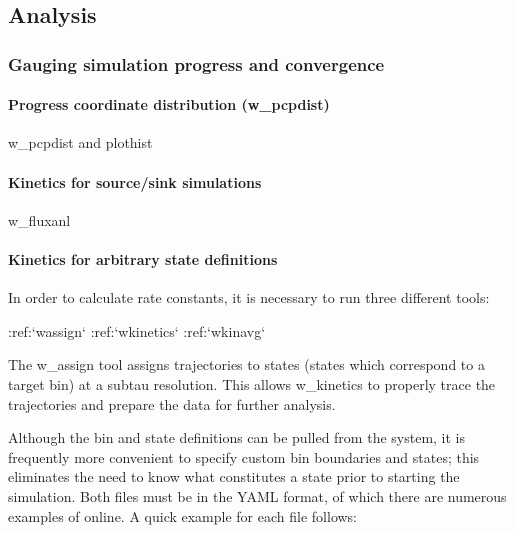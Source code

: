 \documentclass[letterpaper,10pt,english]{sphinxmanual}
\begin{document}
\subsection{Analysis}
\label{\detokenize{users_guide/west/analysis:analysis}}\label{\detokenize{users_guide/west/analysis::doc}}

\subsubsection{Gauging simulation progress and convergence}
\label{\detokenize{users_guide/west/analysis:gauging-simulation-progress-and-convergence}}

\paragraph{Progress coordinate distribution (w\_pcpdist)}
\label{\detokenize{users_guide/west/analysis:progress-coordinate-distribution-w-pcpdist}}
w\_pcpdist and plothist


\paragraph{Kinetics for source/sink simulations}
\label{\detokenize{users_guide/west/analysis:kinetics-for-source-sink-simulations}}
w\_fluxanl


\paragraph{Kinetics for arbitrary state definitions}
\label{\detokenize{users_guide/west/analysis:kinetics-for-arbitrary-state-definitions}}
In order to calculate rate constants, it is necessary to run three different
tools:

\begin{sphinxVerbatim}[commandchars=\\\{\}]
\PYGZhy{} :ref:`w\PYGZus{}assign`
\PYGZhy{} :ref:`w\PYGZus{}kinetics`
\PYGZhy{} :ref:`w\PYGZus{}kinavg`
\end{sphinxVerbatim}

The w\_assign tool assigns trajectories to states (states which correspond to a
target bin) at a sub\sphinxhyphen{}tau resolution. This allows w\_kinetics to properly trace
the trajectories and prepare the data for further analysis.

Although the bin and state definitions can be pulled from the system, it is
frequently more convenient to specify custom bin boundaries and states; this
eliminates the need to know what constitutes a state prior to starting the
simulation. Both files must be in the YAML format, of which there are numerous
examples of online. A quick example for each file follows:
\end{document}
